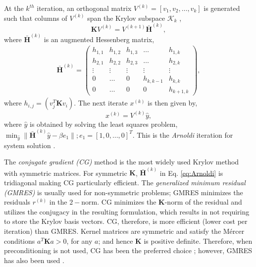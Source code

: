 \documentclass[10pt,journal,letterpaper,compsoc]{IEEEtran}
\begin{document}
At the $k^{th}$ iteration, an orthogonal matrix $V^{(k)}=\left[v_1,v_2,\ldots,v_k\right]$ is generated such that columns of $V^{(k)}$ span the Krylov subspace $\mathcal{K}_k$ \cite{SaadIterativeMethods},
\begin{equation}\mathbf{K}V^{(k)}=V^{(k+1)}\mathbf{\bar{H}}^{(k)},\label{eq:Arnoldi}\end{equation}
where $\mathbf{\bar{H}}^{(k)}$ is an augmented Hessenberg matrix,
 \begin{eqnarray}\mathbf{\bar{H}}^{(k)}=\left(\begin{array}{ccccc}
                                      h_{1,1} & h_{1,2} & h_{1,3} & \ldots & h_{1,k} \\
                                      h_{2,1} & h_{2,2} & h_{2,3} & \ldots & h_{2,k} \\
                                      \vdots  & \vdots & \vdots & \vdots & \vdots \\
                                      0       & \ldots & 0 & h_{k,k-1} & h_{k,k} \\
                                      0       & \ldots & 0 & 0         & h_{k+1,k}
                                    \end{array}\right),\nonumber\end{eqnarray}
where $h_{i,j}=(v_j^T\mathbf{K}v_i)$. The next iterate $x^{(k)}$ is then given by,
\begin{equation}x^{(k)}=V^{(k)}\hat{y},\label{eq:ArnoldiIterate}\end{equation}
where $\hat{y}$ is obtained by solving the least squares problem, $\min_{\hat{y}} \|\mathbf{\bar{H}}^{(k)}\hat{y}-\beta e_1\|; e_1=\left[1,0,\ldots,0\right]^T$. This is the \emph{Arnoldi} iteration for system solution \cite{SaadIterativeMethods}.

The \emph{conjugate gradient (CG)} method is the most widely used Krylov method with symmetric matrices. For symmetric $\mathbf{K}$, $\mathbf{\bar{H}}^{(k)}$ in Eq. \ref{eq:Arnoldi} is tridiagonal making CG particularly efficient. The \emph{generalized minimum residual (GMRES)} is usually used for non-symmetric problems; GMRES minimizes the residuals $r^{(k)}$ in the $2-$norm. CG minimizes the $\mathbf{K}$-norm of the residual and utilizes the conjugacy in the resulting formulation, which results in not requiring to store the Krylov basis vectors. CG, therefore, is more efficient (lower cost per iteration) than GMRES. Kernel matrices are symmetric and satisfy the M\'ercer conditions $a^T\mathbf{K}a>0$, for any $a$; and hence $\mathbf{K}$ is positive definite. Therefore, when preconditioning is not used, CG has been the preferred choice \cite{GPML_Mackay}; however, GMRES has also been used \cite{NandoKrylov}.
\end{document}

